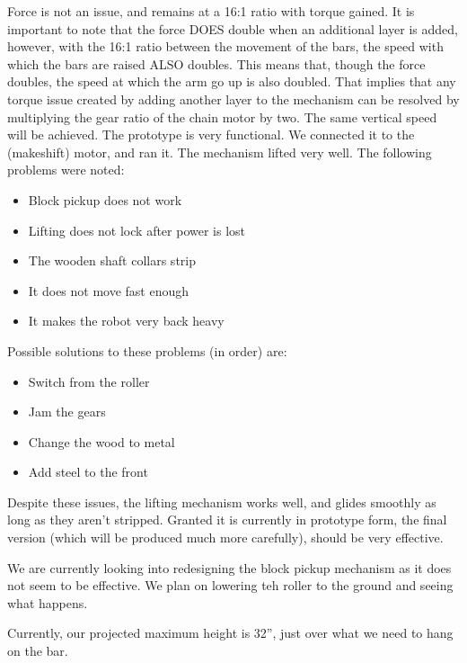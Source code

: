 Force is not an issue, and remains at a 16:1 ratio with torque gained. It is important to note that the force DOES double when an additional layer is added, however, with the 16:1 ratio between the movement of the bars, the speed with which the bars are raised ALSO doubles. This means that, though the force doubles, the speed at which the arm go up is also doubled. That implies that any torque issue created by adding another layer to the mechanism can be resolved by multiplying the gear ratio of the chain motor by two. The same vertical speed will be achieved.
The prototype is very functional. We connected it to the (makeshift) motor, and ran it. The mechanism lifted very well. The following problems were noted:
\begin{itemize}
\item Block pickup does not work
\item Lifting does not lock after power is lost
\item The wooden shaft collars strip
\item It does not move fast enough
\item It makes the robot very back heavy
\end{itemize}

Possible solutions to these problems (in order) are:
\begin{itemize}
\item Switch from the roller
\item Jam the gears
\item Change the wood to metal
\item Add steel to the front
\end{itemize}

Despite these issues, the lifting mechanism works well, and glides smoothly as long as they aren't stripped. Granted it is currently in prototype form, the final version (which will be produced much more carefully), should be very effective.

We are currently looking into redesigning the block pickup mechanism as it does not seem to be effective. We plan on lowering teh roller to the ground and seeing what happens. 

Currently, our projected maximum height is 32”, just over what we need to hang on the bar.
